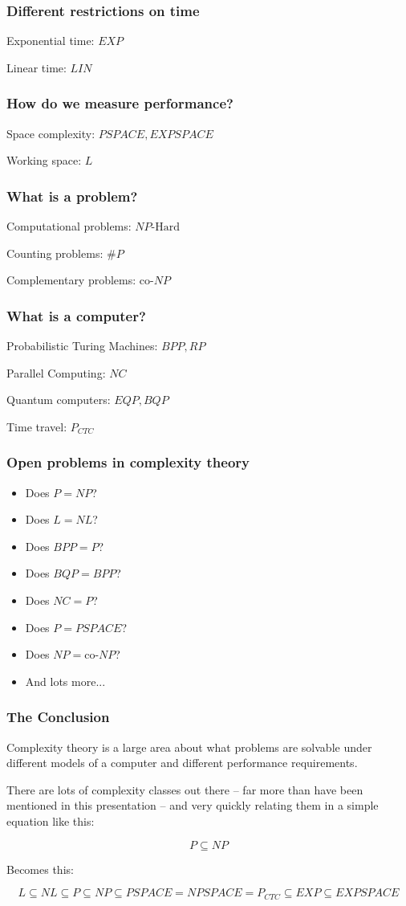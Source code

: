 \documentclass[aspectratio=169]{beamer}
\begin{document}
\begin{frame}
\frametitle{Different restrictions on time}
Exponential time: $EXP$

Linear time: $LIN$
\end{frame}

\begin{frame}
\frametitle{How do we measure performance?}
Space complexity: $PSPACE, EXPSPACE$

Working space: $L$
\end{frame}

\begin{frame}
\frametitle{What is a problem?}
Computational problems: $NP\text{-Hard}$

Counting problems: $\#P$

Complementary problems: $\text{co-}NP$
\end{frame}

\begin{frame}
\frametitle{What is a computer?}
Probabilistic Turing Machines: $BPP, RP$

Parallel Computing: $NC$

Quantum computers:  $EQP, BQP$

Time travel: $P_{CTC}$
\end{frame}

\begin{frame}
\frametitle{Open problems in complexity theory}
\begin{itemize}
    \item<1-> Does $P = NP$?
    \item<2-> Does $L = NL$?
    \item<3-> Does $BPP = P$?
    \item<4-> Does $BQP = BPP$?
    \item<5-> Does $NC = P$?
    \item<6-> Does $P = PSPACE$?
    \item<7-> Does $NP = \text{co-}NP$?
    \item<8-> And lots more...
\end{itemize}
\end{frame}

\begin{frame}
\frametitle{The Conclusion}
Complexity theory is a large area about what problems are solvable under different models of a computer and different performance requirements.

There are lots of complexity classes out there -- far more than have been mentioned in this presentation -- and very quickly relating them in a simple equation like this:

$$P \subseteq NP$$

Becomes this:

$$L \subseteq NL \subseteq P \subseteq NP \subseteq PSPACE = NPSPACE = P_{CTC} \subseteq EXP \subseteq EXPSPACE$$
\end{frame}
\end{document}
